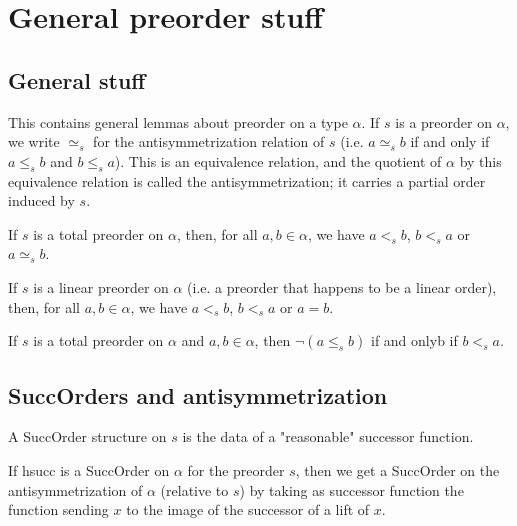 \section{General preorder stuff}

\subsection{General stuff}

This contains general lemmas about preorder on a type $\alpha$. If $s$ is a preorder on $\alpha$, we write $\simeq_s$ for the antisymmetrization relation of $s$
(i.e. $a\simeq_s b$ if and only if $a\le_s b$ and $b\le_s a$). This is an equivalence relation, and the quotient of $\alpha$ by this equivalence relation is
called the antisymmetrization; it carries a partial order induced by $s$.

\begin{sublemma}
If $s$ is a total preorder on $\alpha$, then, for all $a,b\in\alpha$, we have $a <_s b$, $b<_s a$ or $a\simeq_s b$.

\end{sublemma}

\begin{sublemma}
If $s$ is a linear preorder on $\alpha$ (i.e. a preorder that happens to be a linear order), then, for all $a,b\in\alpha$, we have $a <_s b$, $b<_s a$ or $a=b$.
    
\end{sublemma}

\begin{sublemma}
If $s$ is a total preorder on $\alpha$ and $a,b\in\alpha$, then $\neg(a \le_s b)$ if and onlyb if $b<_s a$.

\end{sublemma}


\subsection{SuccOrders and antisymmetrization}

A SuccOrder structure on $s$ is the data of a "reasonable" successor function.

\begin{subdefi}[SuccOrdertoAntisymmetrization]
If hsucc is a SuccOrder on $\alpha$ for the preorder $s$, then we get a SuccOrder on the antisymmetrization of $\alpha$ (relative to $s$) by
taking as successor function the function sending $x$ to the image of the successor of a lift of $x$.

\end{subdefi}

